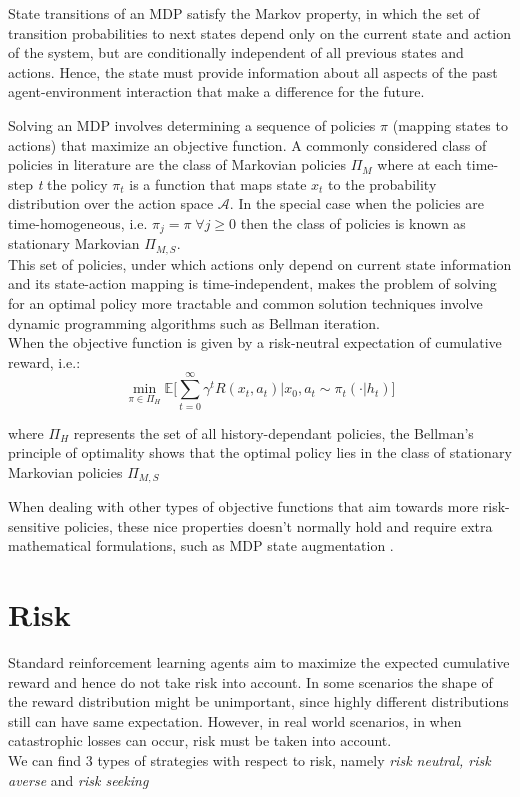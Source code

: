 State transitions of an MDP satisfy the Markov property, in which
the set of transition probabilities to next states depend only on the current state and action of the system,
but are conditionally independent of all previous states and actions. Hence, the state must
provide information about all aspects of the past agent-environment interaction that
make a difference for the future.

Solving an MDP involves determining a sequence of policies $\pi$ (mapping states to actions)
that maximize an objective function.
A commonly considered class of policies in literature are the class of Markovian policies $\Pi_M$ where
at each time-step \textit{t} the policy $\pi_t$ is a function that maps state $x_t$ to 
the probability distribution over the action space $\mathcal{A}$. 
In the special case when the policies are time-homogeneous, i.e. $\pi_j = \pi \; \forall j \geq 0$ then the
class of policies is known as stationary Markovian $\Pi_{M,S}$.\\
This set of policies, under which actions only depend on current state information and
its state-action mapping is time-independent, makes the problem of solving for an optimal policy more
tractable and common solution techniques involve dynamic programming algorithms \citep{Bertsekas1995}
such as Bellman iteration.\\
When the objective function is given by a risk-neutral expectation of cumulative reward,
i.e.:
\begin{equation}
    \underset{\pi \in \Pi_H}{\min} \mathbb E  \big [  \sum_{t=0}^{\infty} \gamma^t R(x_t,a_t) | x_0, a_t \sim \pi_t(\cdot |h_t)  \big]
\end{equation} 

where $ \Pi_H$ represents the set of all history-dependant policies,
the Bellman's principle of optimality \citep{Bertsekas1995} shows that the optimal
policy lies in the class of stationary Markovian policies $\Pi_{M,S}$

When dealing with other types of objective functions that aim towards more risk-sensitive
policies, these nice properties doesn't normally hold
and require extra mathematical formulations, such as MDP state augmentation \citep{Chow2015}.



\section{Risk}
Standard reinforcement learning agents aim to maximize the expected cumulative reward and hence
do not take risk into account. In some scenarios the shape of the reward distribution might be unimportant,
since highly different distributions still can have same expectation. However, in real world scenarios, 
in  when catastrophic losses can occur, risk must be taken into account.\\
We can find 3 types of strategies with respect to risk, namely \textit{risk neutral, risk averse} and \textit{risk seeking}

